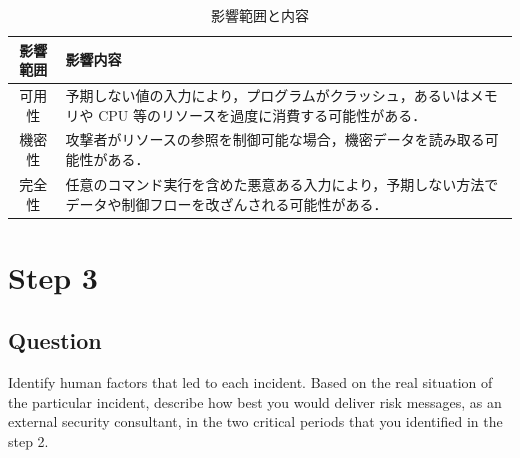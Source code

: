 \documentclass[uplatex]{jsarticle}
\begin{document}
\begin{table}[htbp]
    \centering
    \caption{影響範囲と内容}
    \label{tab:influence}
    \begin{tabular}{|c|p{10cm}|}
    \hline
    影響範囲 & 影響内容 \\ \hline
    可用性 & 予期しない値の入力により，プログラムがクラッシュ，あるいはメモリや CPU 等のリソースを過度に消費する可能性がある． \\ \hline
    機密性 & 攻撃者がリソースの参照を制御可能な場合，機密データを読み取る可能性がある． \\ \hline
    完全性 & 任意のコマンド実行を含めた悪意ある入力により，予期しない方法でデータや制御フローを改ざんされる可能性がある． \\ \hline
    \end{tabular}
\end{table}

\section*{Step 3}
\subsection*{Question}
Identify human factors that led to each incident. Based on the real situation of the particular incident, describe how best you would deliver risk messages, as an external security consultant, in the two critical periods that you identified in the step 2.
\end{document}

